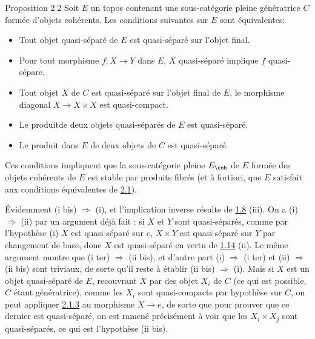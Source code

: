 \begin{enonce*}{Proposition 2.2}
Soit $E$ un topos contenant une sous-catégorie pleine génératrice $C$
formée d'objets cohérents. Les conditions suivantes sur $E$ sont
équivalentes:
\begin{itemize}
\item[(i)] Tout objet quasi-séparé de $E$ est quasi-séparé sur l'objet
  final.

\item[(i bis)] Pour tout morphisme $f : X \to Y$ dans $E$, $X$
  quasi-séparé implique $f$ quasi-sépare.

\item[(i ter)] Tout objet $X$ de $C$ est quasi-séparé sur l'objet final de $E$,
  \ie le morphisme diagonal $X \to X \times X$ est quasi-compact.

\item[(ii)] Le produit\pageoriginale de deux objets quasi-séparés de $E$ est
  quasi-séparé.

\item[(ii bis)] Le produit dans $E$ de deux objets de $C$ est quasi-séparé.
\end{itemize}

Ces conditions impliquent que la sous-catégorie pleine $E_{\coh}$ de
$E$ formée des objets cohérents de $E$ est stable par produits fibrés
(et à fortiori, que $E$ satisfait aux conditions équivalentes de \hyperref[VI.prop2.1]{2.1}).
\end{enonce*}

Évidemment (i bis) $\Rightarrow$ (i), et l'implication inverse
résulte de \hyperref[VI.prop1.8]{1.8} (iii). On a (i) $\Rightarrow$ (ii) par
un argument déjà fait : si $X$ et $Y$ sont quasi-séparés, comme par
l'hypothèse (i) $X$ est quasi-séparé sur $e$, $X \times Y$ est
quasi-séparé sur $Y$ par changement de base, donc $X$ est
quasi-séparé en vertu de \hyperref[VI.prop1.14]{1.14} (ii). Le même argument
montre que (i ter) $\Rightarrow$ (ii bis), et d'autre part (i)
$\Rightarrow$ (i ter) et (ii) $\Rightarrow$ (ii bis) sont triviaux,
de sorte qu'il reste à établir (ii bis) $\Rightarrow$ (i). Mais si
$X$ est un objet quasi-séparé de $E$, recouvrant $X$ par des objet
$X_i$ de $C$ (ce qui est possible, $C$ étant génératrice), comme les
$X_i$ sont quasi-compacts par hypothèse sur $C$, on peut appliquer
\hyperref[VI.lem2.1.3]{2.1.3} au morphisme $X \to e$, de sorte que pour prouver
que ce dernier est quasi-séparé, on est ramené précisément à voir
que les $X_i \times X_j$ sont quasi-séparés, ce qui est l'hypothèse
(ii bis).

